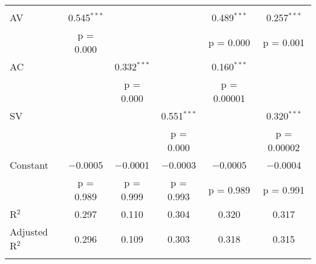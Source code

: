 
\begin{tabular}{@{\extracolsep{5pt}}lccccc} 
\\[-1.8ex] 
\hline \\[-1.8ex] 
 AV & 0.545$^{***}$ &  &  & 0.489$^{***}$ & 0.257$^{***}$ \\ 
  & p = 0.000 &  &  & p = 0.000 & p = 0.001 \\ 
 AC &  & 0.332$^{***}$ &  & 0.160$^{***}$ &  \\ 
  &  & p = 0.000 &  & p = 0.00001 &  \\ 
 SV &  &  & 0.551$^{***}$ &  & 0.320$^{***}$ \\ 
  &  &  & p = 0.000 &  & p = 0.00002 \\ 
 Constant & $-$0.0005 & $-$0.0001 & $-$0.0003 & $-$0.0005 & $-$0.0004 \\ 
  & p = 0.989 & p = 0.999 & p = 0.993 & p = 0.989 & p = 0.991 \\ 
R$^{2}$ & 0.297 & 0.110 & 0.304 & 0.320 & 0.317 \\ 
Adjusted R$^{2}$ & 0.296 & 0.109 & 0.303 & 0.318 & 0.315 \\ 
\hline \\[-1.8ex] 
\end{tabular} 
